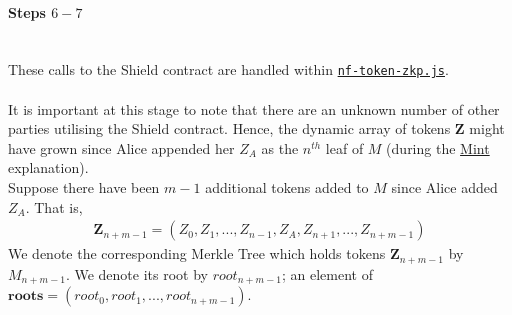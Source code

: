 \documentclass{article}
\begin{document}
\paragraph{Steps $6 - 7$}
\ \\
These calls to the Shield contract are handled within \hyperref[sec:nf-token-zkp]{\texttt{nf-token-zkp.js}}.\\
\\
It is important at this stage to note that there are an unknown number of other parties utilising the Shield contract.
Hence, the dynamic array of tokens $\bm{Z}$ might have grown since Alice appended her $Z_A$ as the $n^{th}$ leaf of $M$ (during the \hyperref[sec:721Mint]{Mint} explanation).\\
Suppose there have been $m-1$ additional tokens added to $M$ since Alice added $Z_A$.
That is,\\
\begin{align*}
  \bm{Z}_{n+m-1} = (Z_0, Z_1,...,Z_{n-1}, Z_A, Z_{n+1},..., Z_{n+m-1})
\end{align*}
We denote the corresponding Merkle Tree which holds tokens $\bm{Z}_{n+m-1}$ by $M_{n+m-1}$.
We denote its root by $root_{n+m-1}$; an element of $\bm{roots} = (root_0, root_1,...,root_{n+m-1})$.\\
\\
\end{document}
